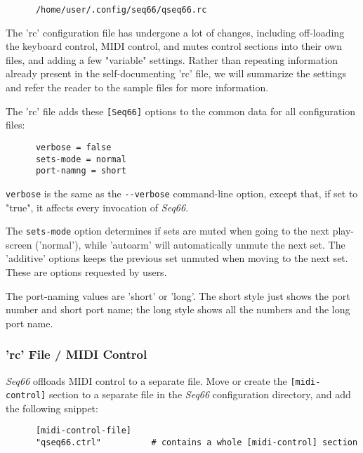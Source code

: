    \begin{verbatim}
      /home/user/.config/seq66/qseq66.rc
   \end{verbatim}

   The 'rc' configuration file has undergone a lot of changes, including
   off-loading the keyboard control, MIDI control, and mutes control sections
   into their own files, and adding a few "variable" settings.
   Rather than repeating information already present in the self-documenting
   'rc' file, we will summarize the settings and refer the reader to the sample
   files for more information.

   The 'rc' file adds these \texttt{[Seq66]} options to the common
   data for all configuration files:

   \begin{verbatim}
      verbose = false
      sets-mode = normal
      port-namng = short
   \end{verbatim}

   \texttt{verbose} is the same as the \texttt{-{}-verbose} command-line option,
   except that, if set to "true", it affects every invocation of \textsl{Seq66}.

   The \texttt{sets-mode} option determines if sets are muted when going to the
   next play-screen ('normal'), while 'autoarm' will automatically
   unmute the next set.  The 'additive' options keeps the previous
   set unmuted when moving to the next set.  These are options requested by
   users.

  The port-naming values are 'short' or 'long'.  The short style
  just shows the port number and short port name; the long style
  shows all the numbers and the long port name.

\subsubsection{'rc' File / MIDI Control}
\label{subsubsec:configuration_rc_midi_control}

   \textsl{Seq66} offloads MIDI control to a separate file.
   Move or create
   the \texttt{[midi-control]} section to a separate file in
   the \textsl{Seq66} configuration directory, and add the following
   snippet:

   \begin{verbatim}
      [midi-control-file]
      "qseq66.ctrl"          # contains a whole [midi-control] section
   \end{verbatim}

